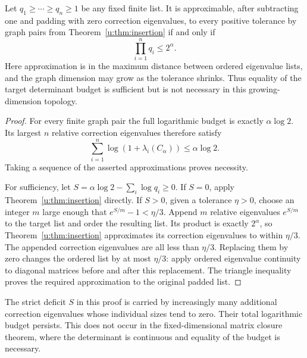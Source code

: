 \begin{corollary}\label{u:cor:closure}
Let $q_1\ge\cdots\ge q_n\ge1$ be any fixed finite list. It is
approximable, after subtracting one and padding with zero correction
eigenvalues, to every positive tolerance by graph pairs from
Theorem~\ref{u:thm:insertion} if and only if
\[
 \prod_{i=1}^n q_i\le2^\alpha.
\]
Here approximation is in the maximum distance between ordered
eigenvalue lists, and the graph dimension may grow as the tolerance
shrinks. Thus equality of the target determinant budget is sufficient
but is not necessary in this growing-dimension topology.
\end{corollary}
\begin{proof}
For every finite graph pair the full logarithmic budget is exactly
$\alpha\log2$. Its largest $n$ relative correction eigenvalues
therefore satisfy
\[
 \sum_{i=1}^n\log(1+\lambda_i(C_\alpha))\le\alpha\log2.
\]
Taking a sequence of the asserted approximations proves necessity.

For sufficiency, let
$S=\alpha\log2-\sum_i\log q_i\ge0$.
If $S=0$, apply Theorem~\ref{u:thm:insertion} directly.
If $S>0$, given a tolerance $\eta>0$, choose an integer $m$ large
enough that $e^{S/m}-1<\eta/3$. Append $m$ relative eigenvalues
$e^{S/m}$ to the target list and order the resulting list.
Its product is exactly $2^\alpha$, so Theorem~\ref{u:thm:insertion}
approximates its correction eigenvalues to within $\eta/3$.
The appended correction eigenvalues are all less than $\eta/3$.
Replacing them by zero changes the ordered list by at most $\eta/3$:
apply ordered eigenvalue continuity to diagonal matrices before and
after this replacement. The triangle inequality proves the required
approximation to the original padded list.
\end{proof}

The strict deficit $S$ in this proof is carried by increasingly many
additional correction eigenvalues whose individual sizes tend to zero.
Their total logarithmic budget persists. This does not occur in the
fixed-dimensional matrix closure theorem, where the determinant is
continuous and equality of the budget is necessary.

